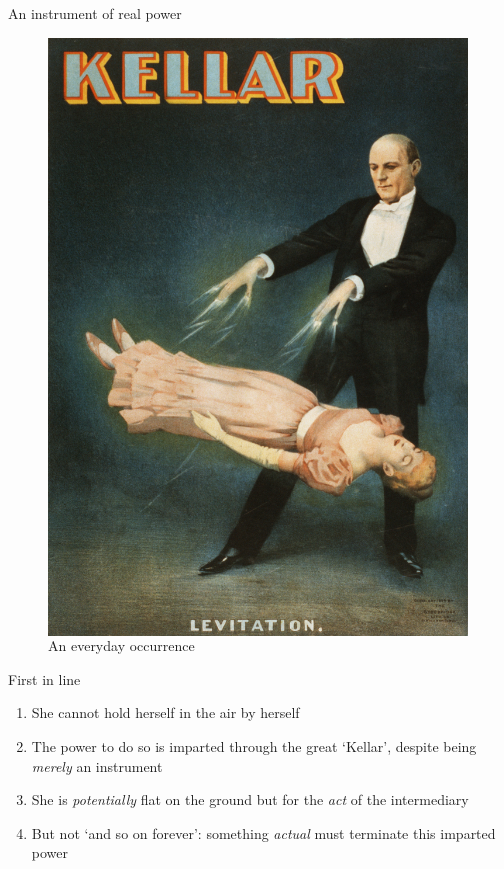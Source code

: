 \documentclass[xcolor=dvipsnames]{beamer}
\begin{document}
\begin{frame}{An instrument of real power}
\begin{figure}
\begin{columns}
    \centering
    \caption {An everyday occurrence}
    \includegraphics[width=0.99\textwidth]{levitation}
  \end{columns}
\end{figure}
\end{frame}


\begin{frame}[fragile]{First in line}
  \begin{enumerate}
  \item She cannot hold herself in the air by herself \vspace{5mm}
  \item The power to do so is imparted through the great `Kellar', despite being \emph{merely} an instrument \vspace{5mm}
  \item She is \emph{potentially} flat on the ground but for the \emph{act} of the intermediary \vspace{5mm}
  \item But not `and so on forever': something \emph{actual} must terminate this imparted power \vspace{5mm}
  \end{enumerate}
\end{frame}
\end{document}
